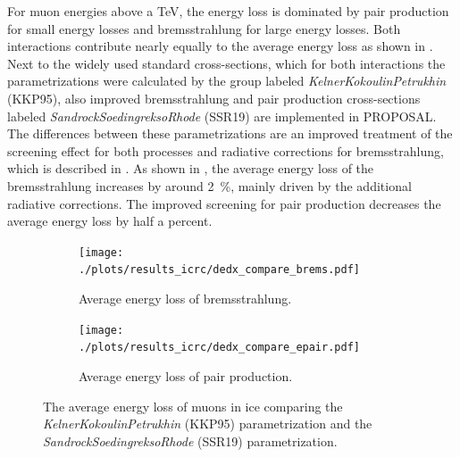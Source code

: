 For muon energies above a TeV, the energy loss is dominated by pair production for small energy losses and bremsstrahlung for large energy losses.
Both interactions contribute nearly equally to the average energy loss as shown in .
Next to the widely used standard cross-sections, which for both interactions the parametrizations were calculated by the group labeled \textit{KelnerKokoulinPetrukhin} (KKP95), also improved bremsstrahlung and pair production cross-sections labeled \textit{SandrockSoedingreksoRhode} (SSR19) are implemented in PROPOSAL.
The differences between these parametrizations are an improved treatment of the screening effect for both processes and radiative corrections for bremsstrahlung, which is described in .
As shown in , the average energy loss of the bremsstrahlung increases by around \SI{2}{\%}, mainly driven by the additional radiative corrections.
The improved screening for pair production decreases the average energy loss by half a percent.
\begin{figure}
    \centering
    \begin{subfigure}[t]{0.47\textwidth}
        \centering
        \texttt{[image: ./plots/results\_icrc/dedx\_compare\_brems.pdf]}
        \caption{Average energy loss of bremsstrahlung.}
        \label{fig:dedx_brems_kkp_ssr}
    \end{subfigure}
    \hfill
    \begin{subfigure}[t]{0.47\textwidth}
        \centering
        \texttt{[image: ./plots/results\_icrc/dedx\_compare\_epair.pdf]}
        \caption{Average energy loss of pair production.}
        \label{fig:dedx_epair_kkp_ssr}
    \end{subfigure}
    \caption{The average energy loss of muons in ice comparing the \textit{KelnerKokoulinPetrukhin} (KKP95) parametrization and the \textit{SandrockSoedingreksoRhode} (SSR19) parametrization.}
    \label{fig:dedx_kkp_ssr}
\end{figure}

